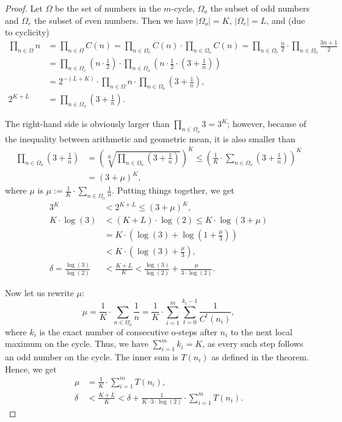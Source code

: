 \documentclass[12pt,reqno]{article}
\begin{document}
\begin{proof}
Let $\Omega$ be the set of numbers in the $m$-cycle, $\Omega_o$ the subset of odd numbers and $\Omega_e$ the subset of even numbers. Then we have $\left|\Omega_o\right|=K$,  $\left|\Omega_e\right|=L$, and (due to cyclicity)
\begin{align*}
\prod_{n \in \Omega} n &= \prod_{n \in \Omega} C(n) = \prod_{n \in \Omega_e} C(n) \cdot \prod_{n \in \Omega_o} C(n) = \prod_{n \in \Omega_e} \frac{n}{2} \cdot \prod_{n \in \Omega_o} \frac{3n+1}{2}\\
\quad &= \prod_{n \in \Omega_e} \left(n \cdot \frac{1}{2}\right) \cdot \prod_{n \in \Omega_o} \left(n \cdot \frac{1}{2} \cdot \left(3+\frac{1}{n}\right)\right) \\
\quad &= 2^{-(L+K)} \cdot \prod_{n \in \Omega} n  \cdot \prod_{n \in \Omega_o} \left(3+\frac{1}{n}\right),\\
2^{K+L} &= \prod_{n \in \Omega_o} \left(3+\frac{1}{n}\right).
\end{align*}

The right-hand side is obviously larger than $\prod_{n \in \Omega_o} 3 = 3^K$; however, because of the inequality between arithmetic and geometric mean, it is also smaller than 
\begin{align*}
\prod_{n \in \Omega_o} \left(3+\frac{1}{n}\right) &= \left(\sqrt[K]{\prod_{n \in \Omega_o} \left(3+\frac{1}{n}\right)}\right)^K \leq \left(\frac{1}{K} \cdot \sum_{n \in \Omega_o} \left(3+\frac{1}{n}\right) \right)^K\\
\quad &= (3+\mu)^K, 
\end{align*}
where $\mu$ is $\mu:=\tfrac{1}{K} \cdot  \sum_{n \in \Omega_o} \tfrac{1}{n}$. Putting things together, we get
\begin{align*}
3^K & < 2^{K+L} \leq (3+\mu)^K,\\
K \cdot \log (3) &< (K+L) \cdot \log (2) \leq K \cdot \log (3+\mu)\\
\quad &=K \cdot \left(\log(3) + \log\left(1+\frac{\mu}{3}\right)\right)\\
&< K \cdot \left(\log(3) +\frac{\mu}{3} \right),\\
\delta=\frac{\log(3)}{\log(2)}&<\frac{K+L}{K}<\frac{\log(3)}{\log(2)}+\frac{\mu}{3\cdot \log(2)}.
\end{align*}

Now let us rewrite $\mu$:
\[
\mu=\frac{1}{K} \cdot  \sum_{n \in \Omega_o} \frac{1}{n}=\frac{1}{K} \cdot \sum_{i=1}^m \sum_{t=0}^{k_i-1} \frac{1}{C^t(n_i)},
\]
where $k_i$ is the exact number of consecutive o-steps after $n_i$ to the next local maximum on the cycle. Thus, we have $\sum_{i=1}^m k_i=K$, as every such step follows an odd number on the cycle. The inner sum is $T(n_i)$ as defined in the theorem. Hence, we get
\begin{align*}
\mu &= \frac{1}{K} \cdot \sum_{i=1}^m T(n_i),\\
\delta&<\frac{K+L}{K}<\delta+\frac{1}{K\cdot 3 \cdot \log(2)} \cdot  \sum_{i=1}^m T(n_i).
\end{align*}
\end{proof}
\end{document}
